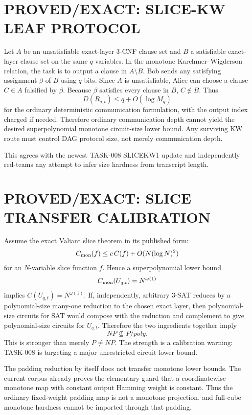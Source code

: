 \documentclass[11pt]{article}
\begin{document}
\section*{PROVED/EXACT: SLICE-KW LEAF PROTOCOL}
Let $A$ be an unsatisfiable exact-layer 3-CNF clause set and $B$ a satisfiable exact-layer clause set on the same $q$ variables. In the monotone Karchmer--Wigderson relation, the task is to output a clause in $A\setminus B$. Bob sends any satisfying assignment $\beta$ of $B$ using $q$ bits. Since $A$ is unsatisfiable, Alice can choose a clause $C\in A$ falsified by $\beta$. Because $\beta$ satisfies every clause in $B$, $C\notin B$. Thus
\[
D(R_{q,t})\le q+O(\log M_q)
\]
for the ordinary deterministic communication formulation, with the output index charged if needed. Therefore ordinary communication depth cannot yield the desired superpolynomial monotone circuit-size lower bound. Any surviving KW route must control DAG protocol size, not merely communication depth.

This agrees with the newest TASK-008 SLICEKW1 update and independently red-teams any attempt to infer size hardness from transcript length.

\section*{PROVED/EXACT: SLICE TRANSFER CALIBRATION}
Assume the exact Valiant slice theorem in its published form:
\[
C_{\rm mon}(f)\le c\,C(f)+O(N(\log N)^2)
\]
for an $N$-variable slice function $f$. Hence a superpolynomial lower bound
\[
C_{\rm mon}(U_{q,t})=N^{\omega(1)}
\]
implies $C(U_{q,t})=N^{\omega(1)}$. If, independently, arbitrary 3-SAT reduces by a polynomial-size many-one reduction to the chosen exact layer, then polynomial-size circuits for SAT would compose with the reduction and complement to give polynomial-size circuits for $U_{q,t}$. Therefore the two ingredients together imply
\[
NP\not\subseteq P/poly.
\]
This is stronger than merely $P\ne NP$. The strength is a calibration warning: TASK-008 is targeting a major unrestricted circuit lower bound.

The padding reduction by itself does not transfer monotone lower bounds. The current corpus already proves the elementary guard that a coordinatewise-monotone map with constant output Hamming weight is constant. Thus the ordinary fixed-weight padding map is not a monotone projection, and full-cube monotone hardness cannot be imported through that padding.
\end{document}
